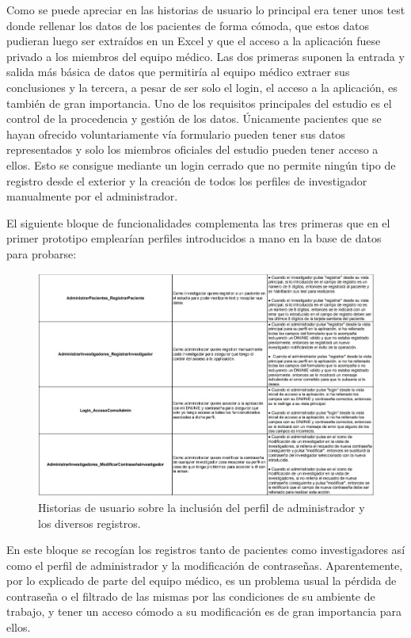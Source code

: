 Como se puede apreciar en las historias de usuario lo principal era tener unos test donde rellenar los datos de los pacientes de forma cómoda, que estos datos pudieran luego ser extraídos en un Excel y que el acceso a la aplicación fuese privado a los miembros del equipo médico. Las dos primeras suponen la entrada y salida más básica de datos que permitiría al equipo médico extraer sus conclusiones y la tercera, a pesar de ser solo el login, el acceso a la aplicación, es también de gran importancia. Uno de los requisitos principales del estudio es el control de la procedencia y gestión de los datos. Únicamente pacientes que se hayan ofrecido voluntariamente vía formulario pueden tener sus datos representados y solo los miembros oficiales del estudio pueden tener acceso a ellos. Esto se consigue mediante un login cerrado que no permite ningún tipo de registro desde el exterior y la creación de todos los perfiles de investigador manualmente por el administrador.
\newpage

El siguiente bloque de funcionalidades complementa las tres primeras que en el primer prototipo emplearían perfiles introducidos a mano en la base de datos para probarse:
\newline

 \begin{figure}[h]
    \centering
     \includegraphics[width=1\textwidth]{images/historiasUsuario-2.jpg}
    \caption{Historias de usuario sobre la inclusión del perfil de administrador y los diversos registros.}
\end{figure}
\FloatBarrier


En este bloque se recogían los registros tanto de pacientes como investigadores así como el perfil de administrador y la modificación de contraseñas. Aparentemente, por lo explicado de parte del equipo médico, es un problema usual la pérdida de contraseña o el filtrado de las mismas por las condiciones de su ambiente de trabajo, y tener un acceso cómodo a su modificación es de gran importancia para ellos.
\newpage

